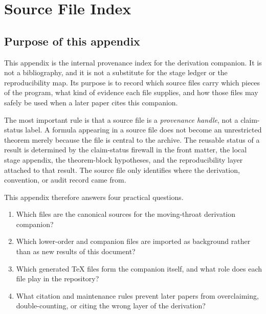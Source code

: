 \chapter{Source File Index}
\label{app:source-file-index}

\providecommand{\SrcFile}[1]{\begingroup\footnotesize\nolinkurl{#1}\endgroup}
\providecommand{\SrcPath}[1]{\begingroup\footnotesize\nolinkurl{#1}\endgroup}

\section{Purpose of this appendix}
\label{sec:source-index-purpose}

This appendix is the internal provenance index for the derivation companion.  It is not a bibliography, and it is not a substitute for the stage ledger or the reproducibility map.  Its purpose is to record which source files carry which pieces of the program, what kind of evidence each file supplies, and how those files may safely be used when a later paper cites this companion.

The most important rule is that a source file is a \emph{provenance handle}, not a claim-status label.  A formula appearing in a source file does not become an unrestricted theorem merely because the file is central to the archive.  The reusable status of a result is determined by the claim-status firewall in the front matter, the local stage appendix, the theorem-block hypotheses, and the reproducibility layer attached to that result.  The source file only identifies where the derivation, convention, or audit record came from.

This appendix therefore answers four practical questions.

\begin{enumerate}[leftmargin=2.4em]
\item Which files are the canonical sources for the moving-throat derivation companion?
\item Which lower-order and companion files are imported as background rather than as new results of this document?
\item Which generated \TeX{} files form the companion itself, and what role does each file play in the repository?
\item What citation and maintenance rules prevent later papers from overclaiming, double-counting, or citing the wrong layer of the derivation?
\end{enumerate}


